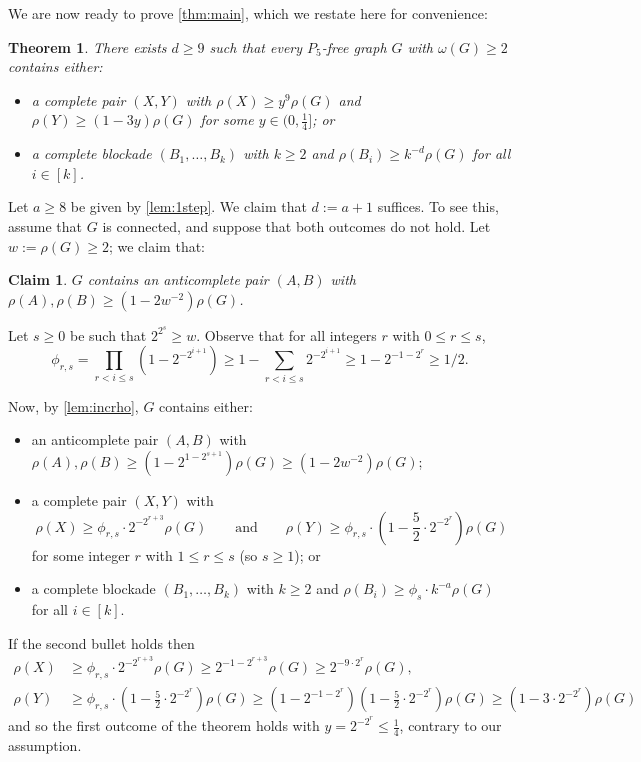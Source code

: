 \documentclass[11pt,reqno]{amsart}
\newtheorem{theorem}{Theorem}[section]
\newtheorem{claim}{Claim}[theorem]
\let\oldendproof\endproof
\renewenvironment{proof}[1][\proofname]{%
	\oldproof[\normalfont\bfseries #1]%
}{\oldendproof}
\renewcommand{\qedsymbol}{$\blacksquare$}%
\newenvironment{subproof}[1][\normalfont\it Subproof]{%
	\renewcommand{\qedsymbol}{$\square$}%
	\begin{proof}[#1]%
	}{%
	\end{proof}%
}
\begin{document}
	We are now ready to prove \cref{thm:main}, which we restate here for convenience:
	\begin{theorem}
		\label{thm:niam}
		There exists $d\ge9$ such that every $P_5$-free graph $G$ with $\omega(G)\ge2$ contains either:
		\begin{itemize}
			\item a complete pair $(X,Y)$ with $\rho(X)\ge y^9\rho(G)$ and $\rho(Y)\ge (1-3y)\rho(G)$ for some $y\in(0,\frac14]$; or
			
			\item a complete blockade $(B_1,\ldots,B_k)$ with $k\ge2$ and $\rho(B_i)\ge k^{-d}\rho(G)$ for all $i\in[k]$.
		\end{itemize}
	\end{theorem}
	\begin{proof}
		Let $a\ge8$ be given by \cref{lem:1step}. We claim that $d:=a+1$ suffices.
		To see this, assume that $G$ is connected, and suppose that both outcomes do not hold.
		Let $w:=\rho(G)\ge2$; we claim that:
		\begin{claim}
			\label{claim:toobig}
			$G$ contains an anticomplete pair $(A,B)$ with $\rho(A),\rho(B)\ge (1-2w^{-2})\rho(G)$.
		\end{claim}
		\begin{subproof}
			Let $s\ge0$ be such that $2^{2^s}\ge w$. Observe that for all integers $r$ with $0\le r\le s$,
			\[\phi_{r,s}=\prod_{r<i\le s}(1-2^{-2^{i+1}})
			\ge 1-\sum_{r<i\le s}2^{-2^{i+1}}\ge 1-2^{-1-2^r}\ge1/2.\]
			
			Now, by \cref{lem:incrho}, $G$ contains either:
			\begin{itemize}
				\item an anticomplete pair $(A,B)$ with $\rho(A),\rho(B)\ge (1-2^{1-2^{s+1}})\rho(G)\ge(1-2w^{-2})\rho(G)$;
				
				\item a complete pair $(X,Y)$ with $$\rho(X)\ge\phi_{r,s}\cdot 2^{-2^{r+3}}\rho(G)
				\qquad\text{and}\qquad
				\rho(Y)\ge\phi_{r,s}\cdot\left(1-\frac52\cdot 2^{-2^r}\right)\rho(G)$$
				for some integer $r$ with $1\le r\le s$ (so $s\ge1$); or
				
				\item a complete blockade $(B_1,\ldots,B_k)$ with $k\ge2$ and $\rho(B_i)\ge\phi_s\cdot k^{-a}\rho(G)$ for all $i\in[k]$.
			\end{itemize}
			
			If the second bullet holds then
			\[\begin{aligned}
				\rho(X)&\ge \phi_{r,s}\cdot 2^{-2^{r+3}}\rho(G)\ge2^{-1-2^{r+3}}\rho(G)\ge2^{-9\cdot 2^r}\rho(G),\\
				\rho(Y)&\ge\phi_{r,s}\cdot\left(1-\frac52\cdot 2^{-2^r}\right)\rho(G)
				\ge(1-2^{-1-2^r})\left(1-\frac52\cdot 2^{-2^r}\right)\rho(G)
				\ge (1-3\cdot2^{-2^r})\rho(G)
			\end{aligned}\]
			and so the first outcome of the theorem holds with $y=2^{-2^r}\le\frac14$, contrary to our assumption.
			

\end{subproof}
\end{proof}
\end{document}
